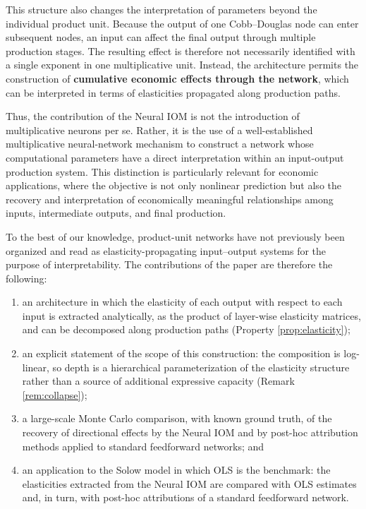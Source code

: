 \documentclass[preprint,12pt,authoryear]{sn-jnl}
\begin{document}
This structure also changes the interpretation of parameters beyond the individual product unit. Because the output of one Cobb--Douglas node can enter subsequent nodes, an input can affect the final output through multiple production stages. The resulting effect is therefore not necessarily identified with a single exponent in one multiplicative unit. Instead, the architecture permits the construction of \textbf{cumulative economic effects through the network}, which can be interpreted in terms of elasticities propagated along production paths. 

Thus, the contribution of the Neural IOM is not the introduction of multiplicative neurons per se. Rather, it is the use of a well-established multiplicative neural-network mechanism to construct a network whose computational parameters have a direct interpretation within an input-output production system. This distinction is particularly relevant for economic applications, where the objective is not only nonlinear prediction but also the recovery and interpretation of economically meaningful relationships among inputs, intermediate outputs, and final production.

To the best of our knowledge, product-unit networks have not previously been organized and read as elasticity-propagating input--output systems for the purpose of interpretability. The contributions of the paper are therefore the following:

\begin{enumerate} [leftmargin=*, itemsep=0pt, topsep=2pt, parsep=0pt]
    \item an architecture in which the elasticity of each output with respect to each input is extracted analytically, as the product of layer-wise elasticity matrices, and can be decomposed along production paths (Property \ref{prop:elasticity});
    \item an explicit statement of the scope of this construction: the composition is log-linear, so depth is a hierarchical parameterization of the elasticity structure rather than a source of additional expressive capacity (Remark \ref{rem:collapse});
    \item a large-scale Monte Carlo comparison, with known ground truth, of the recovery of directional effects by the Neural IOM and by post-hoc attribution methods applied to standard feedforward networks; and
    \item an application to the Solow model in which OLS is the benchmark: the elasticities extracted from the Neural IOM are compared with OLS estimates and, in turn, with post-hoc attributions of a standard feedforward network.
\end{enumerate}
\end{document}

